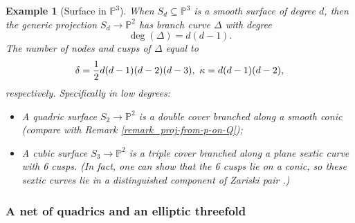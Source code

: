 \documentclass[12pt]{amsart}
\newtheorem{example}[theorem]{Example}
\begin{document}
\begin{example}[Surface in $\mathbb P^3$]\label{prop_S->P^2}\normalfont
 When $S_d\subseteq \mathbb P^3$ is a smooth surface of degree $d$, then the generic projection $S_d\to \mathbb P^2$
has branch curve $\Delta$ with degree $$\deg(\Delta)=d(d-1).$$ 
The number of nodes and cusps of $\Delta$ equal to $$\delta={1\over 2}d(d-1)(d-2)(d-3),\ \kappa=d(d-1)(d-2),$$ respectively. Specifically in low degrees:
\begin{itemize}
    \item[$d=2$] A quadric surface $S_2\to \mathbb P^2$ is a double cover branched along a smooth conic (compare with Remark \ref{remark_proj-from-p-on-Q});
    \item[$d=3$] A cubic surface $S_3\to \mathbb P^2$ is a triple cover branched along a plane sextic curve with 6 cusps. (In fact, one can show that the 6 cusps lie on a conic, so these sextic curves lie in a distinguished component of Zariski pair \cite{Zariskipair}.)
\end{itemize}
\end{example}  



\subsubsection{A net of quadrics and an elliptic threefold}\label{sec_sub_ell-3fold}
\end{document}
